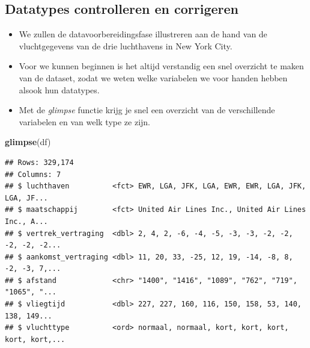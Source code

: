 \documentclass[]{tufte-book}
\newenvironment{Shaded}{}{}
\newcommand{\KeywordTok}[1]{\textcolor[rgb]{0.00,0.44,0.13}{\textbf{#1}}}
\newcommand{\NormalTok}[1]{#1}
\providecommand{\tightlist}{%
  \setlength{\itemsep}{0pt}\setlength{\parskip}{0pt}}
\begin{document}
\hypertarget{datatypes-controlleren-en-corrigeren}{%
\subsection{Datatypes controlleren en corrigeren}\label{datatypes-controlleren-en-corrigeren}}

\begin{itemize}
\tightlist
\item
  We zullen de datavoorbereidingsfase illustreren aan de hand van de vluchtgegevens van de drie luchthavens in New York City.
\item
  Voor we kunnen beginnen is het altijd verstandig een snel overzicht te maken van de dataset, zodat we weten welke variabelen we voor handen hebben alsook hun datatypes.
\item
  Met de \emph{glimpse} functie krijg je snel een overzicht van de verschillende variabelen en van welk type ze zijn.
\end{itemize}

\begin{Shaded}
\begin{Highlighting}[]
\KeywordTok{glimpse}\NormalTok{(df)}
\end{Highlighting}
\end{Shaded}

\begin{verbatim}
## Rows: 329,174
## Columns: 7
## $ luchthaven          <fct> EWR, LGA, JFK, LGA, EWR, EWR, LGA, JFK, LGA, JF...
## $ maatschappij        <fct> United Air Lines Inc., United Air Lines Inc., A...
## $ vertrek_vertraging  <dbl> 2, 4, 2, -6, -4, -5, -3, -3, -2, -2, -2, -2, -2...
## $ aankomst_vertraging <dbl> 11, 20, 33, -25, 12, 19, -14, -8, 8, -2, -3, 7,...
## $ afstand             <chr> "1400", "1416", "1089", "762", "719", "1065", "...
## $ vliegtijd           <dbl> 227, 227, 160, 116, 150, 158, 53, 140, 138, 149...
## $ vluchttype          <ord> normaal, normaal, kort, kort, kort, kort, kort,...
\end{verbatim}
\end{document}
